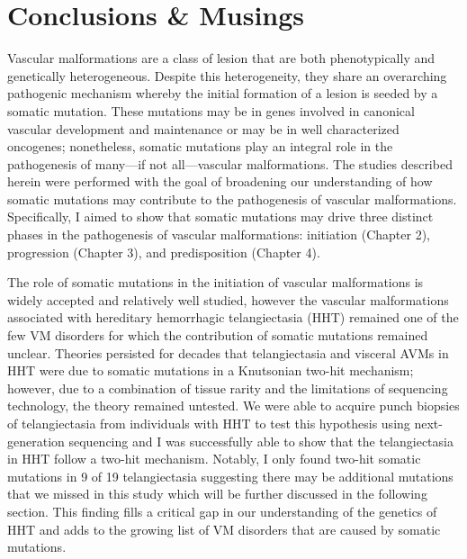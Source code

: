 \chapter{Conclusions \& Musings}
\clearpage

Vascular malformations are a class of lesion that are both phenotypically and genetically heterogeneous. Despite this heterogeneity, they share an overarching pathogenic mechanism whereby the initial formation of a lesion is seeded by a somatic mutation. These mutations may be in genes involved in canonical vascular development and maintenance or may be in well characterized oncogenes; nonetheless, somatic mutations play an integral role in the pathogenesis of many---if not all---vascular malformations. The studies described herein were performed with the goal of broadening our understanding of how somatic mutations may contribute to the pathogenesis of vascular malformations. Specifically, I aimed to show that somatic mutations may drive three distinct phases in the pathogenesis of vascular malformations: initiation (Chapter 2), progression (Chapter 3), and predisposition (Chapter 4). 

The role of somatic mutations in the initiation of vascular malformations is widely accepted and relatively well studied, however the vascular malformations associated with hereditary hemorrhagic telangiectasia (HHT) remained one of the few VM disorders for which the contribution of somatic mutations remained unclear. Theories persisted for decades that telangiectasia and visceral AVMs in HHT were due to somatic mutations in a Knutsonian two-hit mechanism; however, due to a combination of tissue rarity and the limitations of sequencing technology, the theory remained untested. We were able to acquire punch biopsies of telangiectasia from individuals with HHT to test this hypothesis using next-generation sequencing and I was successfully able to show that the telangiectasia in HHT follow a two-hit mechanism. Notably, I only found two-hit somatic mutations in 9 of 19 telangiectasia suggesting there may be additional mutations that we missed in this study which will be further discussed in the following section. This finding fills a critical gap in our understanding of the genetics of HHT and adds to the growing list of VM disorders that are caused by somatic mutations. 

